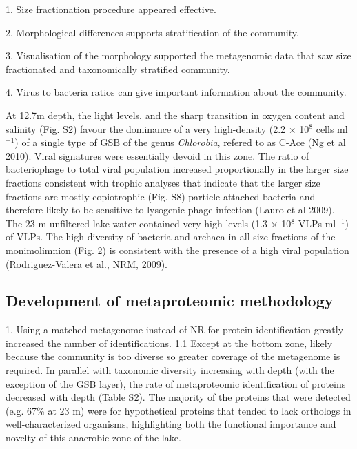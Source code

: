 1. Size fractionation procedure appeared effective.

2. Morphological differences supports stratification of the community.

3. Visualisation of the morphology supported the metagenomic data that saw size fractionated and taxonomically stratified community.

4. Virus to bacteria ratios can give important information about the community.

At 12.7m depth, the light levels, and the sharp transition in oxygen content and salinity (Fig. S2) favour the dominance of a very high-density (2.2 $\times$ 10$^8$ cells ml$^{-1}$) of a single type of \ac{GSB} of the genus \emph{Chlorobia}, refered to as C-Ace (Ng et al 2010). 
Viral signatures were essentially devoid in this zone. 
The ratio of bacteriophage to total viral population increased proportionally in the larger size fractions consistent with trophic analyses that indicate that the larger size fractions are mostly copiotrophic (Fig. S8) particle attached bacteria and therefore likely to be sensitive to lysogenic phage infection (Lauro et al 2009). 
The 23 m unfiltered lake water contained very high levels (1.3 $\times$ 10$^8$ \acp{VLP} ml$^{-1}$) of \acp{VLP}. 
The high diversity of bacteria and archaea in all size fractions of the monimolimnion (Fig. 2) is consistent with the presence of a high viral population (Rodriguez-Valera et al., NRM, 2009).


\subsection{Development of metaproteomic methodology}

1. Using a matched metagenome instead of \ac{NR} for protein identification greatly increased the number of identifications.
1.1 Except at the bottom zone, likely because the community is too diverse so greater coverage of the metagenome is required. %
In parallel with taxonomic diversity increasing with depth (with the exception of the GSB layer), the rate of metaproteomic identification of proteins decreased with depth (Table S2). 
The majority of the proteins that were detected (e.g. 67\% at 23 m) were for hypothetical proteins that tended to lack orthologs in well-characterized organisms, highlighting both the functional importance and novelty of this anaerobic zone of the lake.


